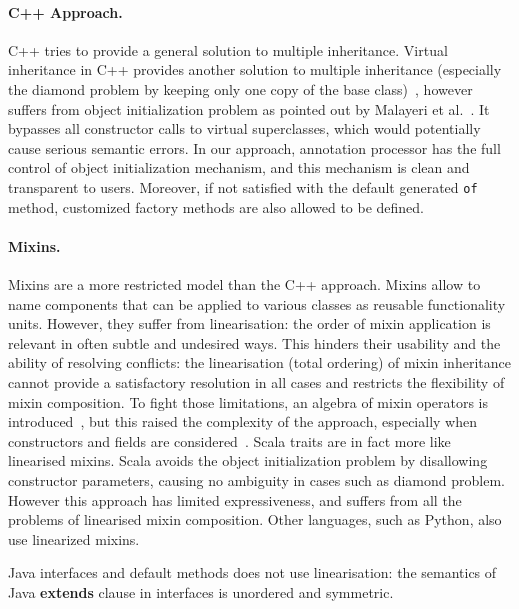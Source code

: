 \paragraph{C++ Approach.}
C++ tries to provide a general solution to multiple inheritance. Virtual
inheritance in C++ provides another solution to multiple inheritance (especially
the diamond problem by keeping only one copy of the base
class)~\cite{ellis1990annotated}, however suffers from object initialization
problem as pointed out by Malayeri et al.~\cite{malayeri2009cz}. It bypasses all
constructor calls to virtual superclasses, which would potentially cause serious
semantic errors.  In our
approach, \mixin annotation processor has the full control of object
initialization mechanism, and this mechanism is clean and transparent to
users. Moreover, if not satisfied with the default generated \texttt{of} method,
customized factory methods are also allowed to be defined.

\paragraph{Mixins.}
Mixins are a more restricted model than the C++ approach. Mixins allow to name
components that can be applied to various classes as reusable functionality
units. However, they suffer from linearisation: the order of mixin application
is relevant in often subtle and undesired ways. This hinders their usability
and the ability of resolving conflicts: the linearisation (total ordering) of
mixin inheritance cannot provide a satisfactory resolution in all cases and
restricts the flexibility of mixin composition. To fight those limitations, an
algebra of mixin operators is introduced~\cite{ancona2002calculus}, but this
raised the complexity of the approach, especially when constructors and fields
are considered~\cite{marco09FJigsaw}. Scala traits are in fact more like linearised mixins.
Scala avoids the object initialization
problem by disallowing constructor parameters, causing no ambiguity in cases
such as diamond problem. However this approach has limited expressiveness, and
suffers from all the problems of linearised mixin composition. Other languages, such as 
Python, also use linearized mixins.
\begin{comment}
Python also offers multiple inheritance via linearised mixins. Indeed in python any class is implicitly a mixin, and mixin composition informally expressed as\\*
\Q@ class A use B,C {...new methods...}@\\*
can be expressed in python as \\*
\Q@ class Aux: ...new methods...@\\*
\Q@ class A(B,C,Aux): pass@ 
\end{comment}
\noindent Java interfaces and default methods does not use
linearisation: the semantics of Java \textbf{extends} clause in
interfaces is unordered and symmetric.


